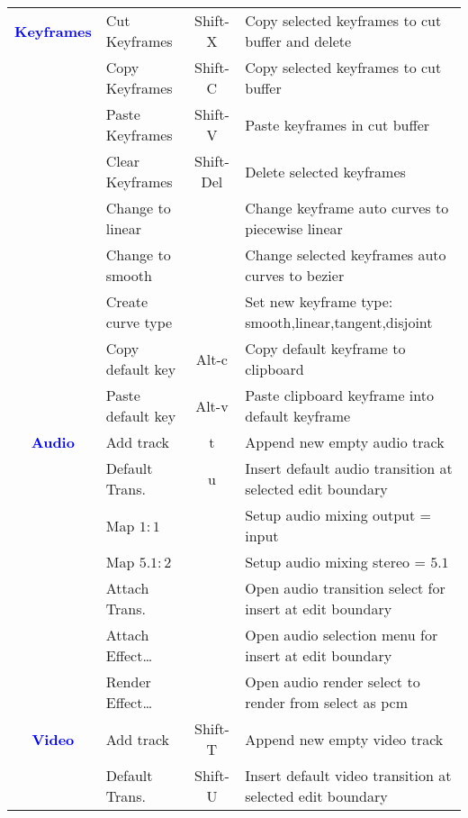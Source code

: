\begin{center}
\begin{longtable}{>{\bfseries}c l c p{6cm}}
             \midrule
         \textcolor{blue}{Keyframes} & Cut Keyframes & Shift-X & Copy selected keyframes to cut buffer and delete \\             
             & Copy Keyframes & Shift-C & Copy selected keyframes to cut buffer \\             
             & Paste Keyframes & Shift-V & Paste keyframes in cut buffer \\             
             & Clear Keyframes & Shift-Del & Delete selected keyframes \\             
             & Change to linear &  & Change keyframe auto curves to piecewise linear \\             
             & Change to smooth &  & Change selected keyframes auto curves to bezier \\             
             & Create curve type &  & Set new keyframe type: smooth,linear,tangent,disjoint \\             
             & Copy default key & Alt-c & Copy default keyframe to clipboard \\             
             & Paste default key & Alt-v & Paste clipboard keyframe into default keyframe \\
             \midrule
         \textcolor{blue}{Audio} & Add track & t & Append new empty audio track \\             
             & Default Trans. & u & Insert default audio transition at selected edit boundary \\             
             & Map $1:1$ &  & Setup audio mixing output = input \\             
             & Map $5.1:2$ &  & Setup audio mixing stereo = $5.1$ \\             
             & Attach Trans. &  & Open audio transition select for insert at edit boundary \\             
             & Attach Effect\dots &  & Open audio selection menu for insert at edit boundary \\             
             & Render Effect\dots &  & Open audio render select to render from select as pcm \\
             \midrule            
          \textcolor{blue}{Video} & Add track & Shift-T & Append new empty video track \\             
             & Default Trans. & Shift-U & Insert default video transition at selected edit boundary \\                         

\end{longtable}
\end{center}

